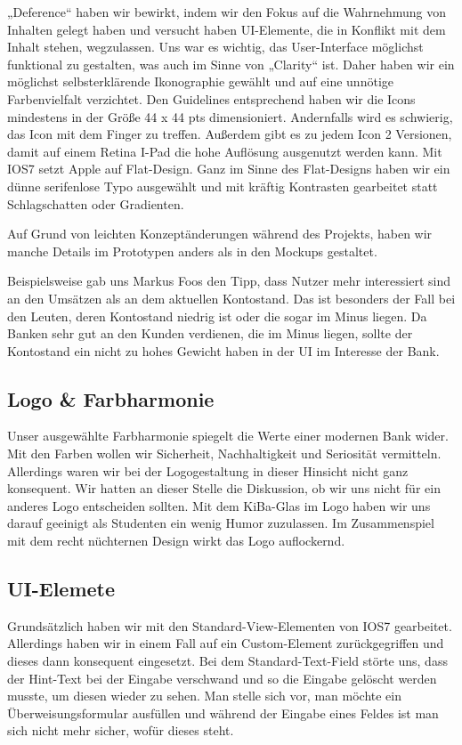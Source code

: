 	„Deference“ haben wir bewirkt, indem wir den Fokus auf die Wahrnehmung von Inhalten gelegt haben und versucht haben UI-Elemente, die in Konflikt mit dem Inhalt stehen, wegzulassen. Uns war es wichtig, das User-Interface möglichst funktional zu gestalten, was auch im Sinne von „Clarity“ ist. Daher haben wir ein möglichst selbsterklärende Ikonographie gewählt und auf eine unnötige Farbenvielfalt verzichtet. Den Guidelines entsprechend haben wir die Icons mindestens in der Größe 44 x 44 pts dimensioniert. Andernfalls wird es schwierig, das Icon mit dem Finger zu treffen. Außerdem gibt es zu jedem Icon 2 Versionen, damit auf einem Retina I-Pad die hohe Auflösung ausgenutzt werden kann. Mit IOS7 setzt Apple auf Flat-Design. Ganz im Sinne des Flat-Designs haben wir ein dünne serifenlose Typo ausgewählt und mit kräftig Kontrasten gearbeitet statt Schlagschatten oder Gradienten.

	Auf Grund von leichten Konzeptänderungen während des Projekts, haben wir manche Details im Prototypen anders als in den Mockups gestaltet.
	
	Beispielsweise gab uns Markus Foos den Tipp, dass Nutzer mehr interessiert sind an den Umsätzen als an dem aktuellen Kontostand. Das ist besonders der Fall bei den Leuten, deren Kontostand niedrig ist oder die sogar im Minus liegen. Da Banken sehr gut an den Kunden verdienen, die im Minus liegen, sollte der Kontostand ein nicht zu hohes Gewicht haben in der UI im Interesse der Bank.

\subsection{Logo \& Farbharmonie}
	Unser ausgewählte Farbharmonie spiegelt die Werte einer modernen Bank wider. Mit den Farben wollen wir Sicherheit, Nachhaltigkeit und Seriosität vermitteln. Allerdings waren wir bei der Logogestaltung in dieser Hinsicht nicht ganz konsequent. Wir hatten an dieser Stelle die Diskussion, ob wir uns nicht für ein anderes Logo entscheiden sollten. Mit dem KiBa-Glas im Logo haben wir uns darauf geeinigt als Studenten ein wenig Humor zuzulassen. Im Zusammenspiel mit dem recht nüchternen Design wirkt das Logo auflockernd.

\subsection{UI-Elemete}
	Grundsätzlich haben wir mit den Standard-View-Elementen von IOS7 gearbeitet. Allerdings haben wir in einem Fall auf ein Custom-Element zurückgegriffen und dieses dann konsequent eingesetzt. Bei dem Standard-Text-Field störte uns, dass der Hint-Text bei der Eingabe verschwand und so die Eingabe gelöscht werden musste, um diesen wieder zu sehen. Man stelle sich vor, man möchte ein Überweisungsformular ausfüllen und während der Eingabe eines Feldes ist man sich nicht mehr sicher, wofür dieses steht. 

